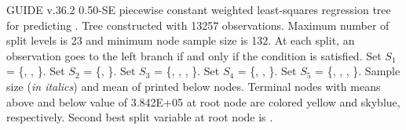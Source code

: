 \documentclass{article}
\begin{document}
GUIDE v.36.2 0.50-SE
piecewise constant weighted least-squares regression tree
for predicting \texttt{}.
 Tree constructed with 13257 observations.
 Maximum number of split levels is 23 and minimum node sample size is 132.
At each split, an observation goes to the left branch 
 if and only if the condition is satisfied.
 Set $S_{1}$ = \{\texttt{}, \texttt{},
 \texttt{}\}.
 Set $S_{2}$ = \{\texttt{}, \texttt{}\}.
 Set $S_{3}$ = \{\texttt{}, \texttt{},
 \texttt{}, \texttt{}\}.
 Set $S_{4}$ = \{\texttt{}, \texttt{},
 \texttt{}\}.
 Set $S_{5}$ = \{\texttt{}, \texttt{},
 \texttt{}, \texttt{}\}.
Sample size (\emph{in italics}) and mean of \texttt{} printed below nodes.
 Terminal nodes with means above and below value of  3.842E+05 at root node are colored yellow and skyblue, respectively.
 Second best split variable at root node is \texttt{}.
 
\end{document}
